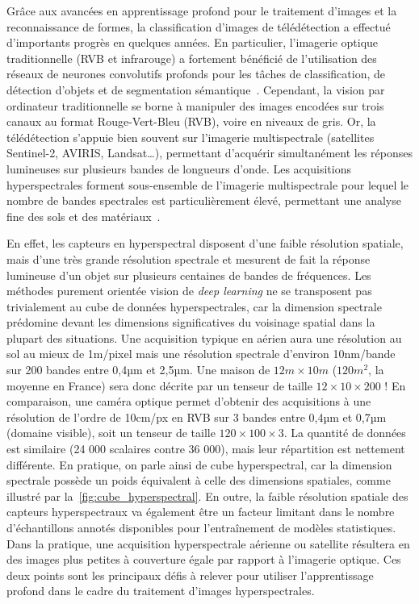 Grâce aux avancées en apprentissage profond pour le traitement d'images et la reconnaissance de formes, la classification d'images de télédétection a effectué d'importants progrès en quelques années. En particulier, l'imagerie optique traditionnelle (\gls{RVB} et infrarouge) a fortement bénéficié de l'utilisation des réseaux de neurones convolutifs profonds pour les tâches de classification, de détection d'objets et de segmentation sémantique~\cite{audebert_semantic_2016,volpi_dense_2017,marmanis_semantic_2016}. Cependant, la vision par ordinateur traditionnelle se borne à manipuler des images encodées sur trois canaux au format Rouge-Vert-Bleu (RVB), voire en niveaux de gris. Or, la télédétection s'appuie bien souvent sur l'imagerie multispectrale (satellites Sentinel-2, AVIRIS, Landsat\dots), permettant d'acquérir simultanément les réponses lumineuses sur plusieurs bandes de longueurs d'onde. Les acquisitions hyperspectrales forment sous-ensemble de l'imagerie multispectrale pour lequel le nombre de bandes spectrales est particulièrement élevé, permettant une analyse fine des sols et des matériaux~\cite{cubero-castan_physics-based_2015,fabre_estimation_2015}.

En effet, les capteurs en hyperspectral disposent d'une faible résolution spatiale, mais d'une très grande résolution spectrale et mesurent de fait la réponse lumineuse d'un objet sur plusieurs centaines de bandes de fréquences. Les méthodes purement orientée vision de \textit{deep learning} ne se transposent pas trivialement au cube de données hyperspectrales, car la dimension spectrale prédomine devant les dimensions significatives du voisinage spatial dans la plupart des situations. Une acquisition typique en aérien aura une résolution au sol au mieux de 1m/pixel mais une résolution spectrale d'environ 10nm/bande sur 200 bandes entre 0,4µm et 2,5µm. Une maison de $12m\times10m$ ($120m^2$, la moyenne en France) sera donc décrite par un tenseur de taille $12\times10\times200$ ! En comparaison, une caméra optique permet d'obtenir des acquisitions à une résolution de l'ordre de 10cm/px en RVB sur 3 bandes entre 0,4µm et 0,7µm (domaine visible), soit un tenseur de taille $120\times100\times3$. La quantité de données est similaire (24 000 scalaires contre 36 000), mais leur répartition est nettement différente. En pratique, on parle ainsi de cube hyperspectral, car la dimension spectrale possède un poids équivalent à celle des dimensions spatiales, comme illustré par la~\cref{fig:cube_hyperspectral}. En outre, la faible résolution spatiale des capteurs hyperspectraux va également être un facteur limitant dans le nombre d'échantillons annotés disponibles pour l'entraînement de modèles statistiques. Dans la pratique, une acquisition hyperspectrale aérienne ou satellite résultera en des images plus petites à couverture égale par rapport à l'imagerie optique. Ces deux points sont les principaux défis à relever pour utiliser l'apprentissage profond dans le cadre du traitement d'images hyperspectrales.


